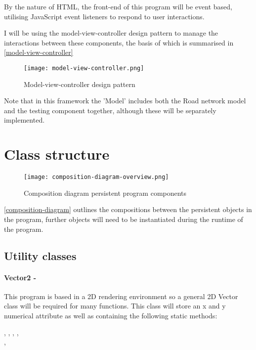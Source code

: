     By the nature of HTML, the front-end of this program will be event based, utilising JavaScript event listeners to respond to user interactions.

    I will be using the model-view-controller design pattern to manage the interactions between these components, the basis of which is summarised in \autoref{model-view-controller}

    \begin{figure}
        \centering
        \texttt{[image: model-view-controller.png]}
        \caption{Model-view-controller design pattern}
        \label{model-view-controller}
    \end{figure}

    Note that in this framework the 'Model' includes both the Road network model and the testing component together, although these will be separately implemented.

\section{Class structure}

    \begin{figure}
        \centering
        \texttt{[image: composition-diagram-overview.png]}
        \caption{Composition diagram persistent program components}
        \label{composition-diagram}
    \end{figure}

    \autoref{composition-diagram} outlines the compositions between the persistent objects in the program, further objects will need to be instantiated during the runtime of the program.

    \subsection{Utility classes}

    \paragraph{Vector2 -}

        This program is based in a 2D rendering environment so a general 2D Vector class will be required for many functions. This class will store an x and y numerical attribute as well as containing the following static methods:

        ,
        ,
        ,
        ,\\
        ,


